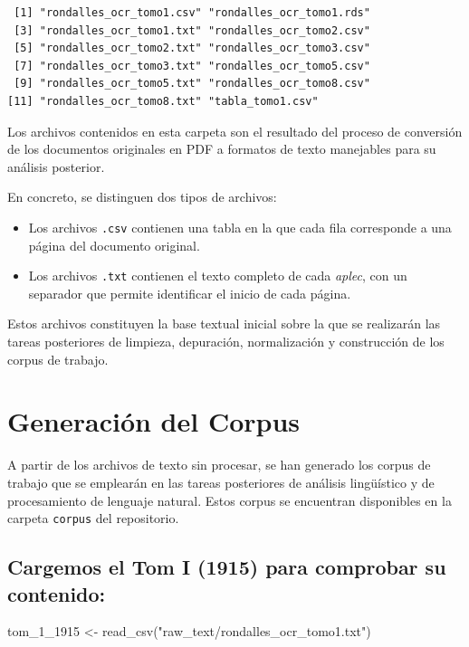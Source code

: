 \documentclass[
  letterpaper,
  DIV=11,
  numbers=noendperiod]{scrreprt}
\newenvironment{Shaded}{\begin{snugshade}}{\end{snugshade}}
\newcommand{\FunctionTok}[1]{\textcolor[rgb]{0.28,0.35,0.67}{#1}}
\newcommand{\NormalTok}[1]{\textcolor[rgb]{0.00,0.23,0.31}{#1}}
\newcommand{\OtherTok}[1]{\textcolor[rgb]{0.00,0.23,0.31}{#1}}
\newcommand{\StringTok}[1]{\textcolor[rgb]{0.13,0.47,0.30}{#1}}
\providecommand{\tightlist}{%
  \setlength{\itemsep}{0pt}\setlength{\parskip}{0pt}}
\begin{document}
\begin{verbatim}
 [1] "rondalles_ocr_tomo1.csv" "rondalles_ocr_tomo1.rds"
 [3] "rondalles_ocr_tomo1.txt" "rondalles_ocr_tomo2.csv"
 [5] "rondalles_ocr_tomo2.txt" "rondalles_ocr_tomo3.csv"
 [7] "rondalles_ocr_tomo3.txt" "rondalles_ocr_tomo5.csv"
 [9] "rondalles_ocr_tomo5.txt" "rondalles_ocr_tomo8.csv"
[11] "rondalles_ocr_tomo8.txt" "tabla_tomo1.csv"        
\end{verbatim}

Los archivos contenidos en esta carpeta son el resultado del proceso de
conversión de los documentos originales en PDF a formatos de texto
manejables para su análisis posterior.

En concreto, se distinguen dos tipos de archivos:

\begin{itemize}
\tightlist
\item
  Los archivos \texttt{.csv} contienen una tabla en la que cada fila
  corresponde a una página del documento original.
\item
  Los archivos \texttt{.txt} contienen el texto completo de cada
  \emph{aplec}, con un separador que permite identificar el inicio de
  cada página.
\end{itemize}

Estos archivos constituyen la base textual inicial sobre la que se
realizarán las tareas posteriores de limpieza, depuración, normalización
y construcción de los corpus de trabajo.

\section{Generación del Corpus}\label{generaciuxf3n-del-corpus}

A partir de los archivos de texto sin procesar, se han generado los
corpus de trabajo que se emplearán en las tareas posteriores de análisis
lingüístico y de procesamiento de lenguaje natural. Estos corpus se
encuentran disponibles en la carpeta \texttt{corpus} del repositorio.

\subsection{Cargemos el Tom I (1915) para comprobar su
contenido:}\label{cargemos-el-tom-i-1915-para-comprobar-su-contenido}

\begin{Shaded}
\begin{Highlighting}[]
\NormalTok{tom\_1\_1915 }\OtherTok{\textless{}{-}} \FunctionTok{read\_csv}\NormalTok{(}\StringTok{"raw\_text/rondalles\_ocr\_tomo1.txt"}\NormalTok{)}
\end{Highlighting}
\end{Shaded}
\end{document}
